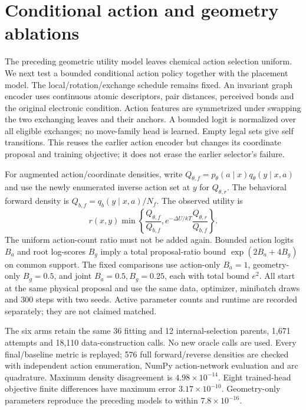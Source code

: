 \section{Conditional action and geometry ablations}
\label{app:action-geometry}

The preceding geometric utility model leaves chemical action selection uniform.
We next test a bounded conditional action policy together with the placement
model. The local/rotation/exchange schedule remains fixed. An invariant graph
encoder uses continuous atomic descriptors, pair distances, perceived bonds and
the original electronic condition. Action features are symmetrized under swapping
the two exchanging leaves and their anchors. A bounded logit is normalized over
all eligible exchanges; no move-family head is learned. Empty legal sets give
self transitions. This reuses the earlier action encoder but changes its
coordinate proposal and training objective; it does not erase the earlier
selector's failure.

For augmented action/coordinate densities, write
$Q_{\theta,f}=p_\theta(a\mid x)q_\theta(y\mid x,a)$ and use the newly enumerated
inverse action set at $y$ for $Q_{\theta,r}$. The behavioral forward density is
$Q_{b,f}=q_b(y\mid x,a)/N_f$. The observed utility is
\begin{equation}
 r(x,y)\min\!\left\{\frac{Q_{\theta,f}}{Q_{b,f}},
 e^{-\Delta U/kT}\frac{Q_{\theta,r}}{Q_{b,f}}\right\}.
\end{equation}
The uniform action-count ratio must not be added again. Bounded action logits
$B_a$ and root log-scores $B_g$ imply a total proposal-ratio bound
$\exp(2B_a+4B_g)$ on common support. The fixed comparisons use action-only
$B_a=1$, geometry-only $B_g=0.5$, and joint $B_a=0.5,B_g=0.25$, each with total
bound $e^2$. All start at the same physical proposal and use the same data,
optimizer, minibatch draws and 300 steps with two seeds. Active parameter counts
and runtime are recorded separately; they are not claimed matched.

The six arms retain the same 36 fitting and 12 internal-selection parents,
1,671 attempts and 18,110 data-construction calls. No new oracle calls are used.
Every final/baseline metric is replayed; 576 full forward/reverse densities are
checked with independent action enumeration, NumPy action-network evaluation
and arc quadrature. Maximum density disagreement is $4.98\times10^{-14}$.
Eight trained-head objective finite differences have maximum error
$3.17\times10^{-10}$. Geometry-only parameters reproduce the preceding models
to within $7.8\times10^{-16}$.

